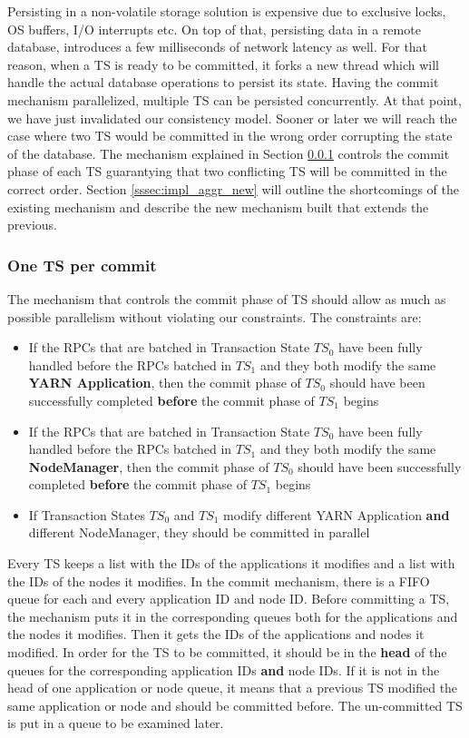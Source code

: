 Persisting in a non-volatile storage solution is expensive due to
exclusive locks, OS buffers, I/O interrupts etc. On top of that,
persisting data in a remote database, introduces a
few milliseconds of network latency as well. For that reason,
when a TS is ready to be committed, it forks
a new thread which will handle the actual database operations to
persist its state. Having the commit mechanism parallelized, multiple
TS can be persisted concurrently. At that point, we have just
invalidated our consistency model. Sooner or later we will
reach the case where two TS would be committed in the wrong order
corrupting the state of the database. The mechanism explained in
Section \ref{sssec:impl_aggr_old} controls the commit phase of each TS
guarantying that two conflicting TS will be committed in the correct
order. Section \ref{sssec:impl_aggr_new} will outline the
shortcomings of the existing mechanism and describe the new mechanism
built that extends the previous.

\subsubsection{One TS per commit}
\label{sssec:impl_aggr_old}
The mechanism that controls the commit phase of TS should allow as
much as possible parallelism without violating our constraints. The
constraints are:
\begin{itemize}
\item If the RPCs that are batched in Transaction State $TS_0$ have
  been fully handled before the RPCs batched in $TS_1$ and they both
  modify the same \textbf{YARN Application}, then the commit phase of $TS_0$
  should have been successfully completed \textbf{before} the commit
  phase of $TS_1$ begins

\item If the RPCs that are batched in Transaction State $TS_0$ have
  been fully handled before the RPCs batched in $TS_1$ and they both
  modify the same \textbf{NodeManager}, then the commit phase of $TS_0$
  should have been successfully completed \textbf{before} the commit
  phase of $TS_1$ begins

\item If Transaction States $TS_0$ and $TS_1$ modify different YARN
  Application \textbf{and} different NodeManager, they should be committed in parallel
\end{itemize}

Every TS keeps a list with the IDs of the applications it modifies and
a list with the IDs of the nodes it modifies. In the commit mechanism,
there is a FIFO queue for each and every application ID and node
ID. Before committing a TS, the mechanism puts it in the corresponding
queues both for the applications and the nodes it modifies. Then it
gets the IDs of the applications and nodes it modified. In order for
the TS to be committed, it should be in the \textbf{head} of the
queues for the corresponding application IDs \textbf{and} node IDs. If
it is not in the head of one application or node queue, it means that
a previous TS modified the same application or node and should be
committed before. The un-committed TS is put in a queue to be
examined later.

